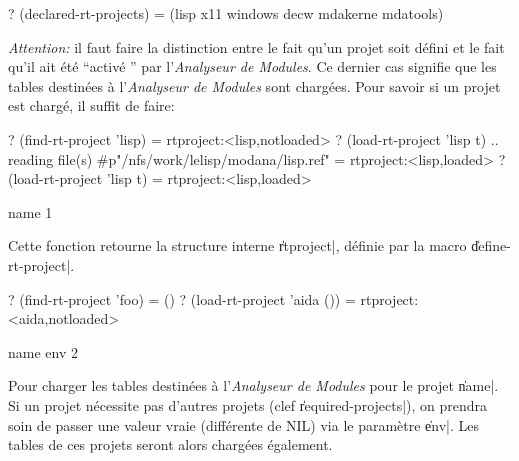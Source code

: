 \begin{Code*}
? (declared-rt-projects)
= (lisp x11 windows decw mdakerne mdatools)
\end{Code*}

{\em Attention:} il faut faire la distinction entre le fait qu'un
projet soit d\'{e}fini et le fait qu'il ait \'{e}t\'{e} ``activ\'{e} {''} par
l'{\em Analyseur de Modules}. Ce dernier cas signifie que les tables
destin\'{e}es \`{a} 
l'{\em Analyseur de Modules} sont charg\'{e}es. Pour savoir si un projet
est charg\'{e}, il suffit de faire:

\begin{Code*}
? (find-rt-project 'lisp)
= rtproject:<lisp,notloaded>
? (load-rt-project 'lisp t)
.. reading file(s) #p"/nfs/work/lelisp/modana/lisp.ref"
= rtproject:<lisp,loaded>
? (load-rt-project 'lisp t)
= rtproject:<lisp,loaded>
\end{Code*}

%

 {name} {1}

Cette fonction retourne la structure interne \|rtproject|, d\'{e}finie par la
macro \|define-rt-project|.

\begin{Code*}
? (find-rt-project 'foo)
= ()
? (load-rt-project 'aida ())
= rtproject:<aida,notloaded>
\end{Code*}


 {name env} {2}

Pour charger les tables destin\'{e}es \`{a} l'{\em Analyseur de Modules}
pour le projet \|name|. 
Si un projet n\'{e}cessite pas d'autres
projets (clef \|required-projects|), on prendra soin de passer une
valeur vraie (diff\'{e}rente de NIL) via le param\`{e}tre \|env|. Les tables
de ces projets seront alors charg\'{e}es \'{e}galement.

